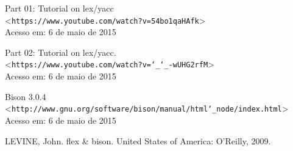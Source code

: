 \clearpage

\begin{thebibliography}{9}


		Part 01: Tutorial on lex/yacc \\
		\textless\texttt{https://www.youtube.com/watch?v=54bo1qaHAfk}\textgreater\\
		Acesso em: 6 de maio de 2015

		Part 02: Tutorial on lex/yacc.\\
		\textless\texttt{https://www.youtube.com/watch?v=\char`_\char`_-wUHG2rfM}\textgreater\\
		Acesso em: 6 de maio de 2015

		Bison 3.0.4 \\
		\textless\texttt{http://www.gnu.org/software/bison/manual/html\char`_node/index.html}\textgreater\\
		Acesso em: 6 de maio de 2015

		LEVINE, John. flex \& bison. United States of America: O'Reilly, 2009.


\end{thebibliography}


